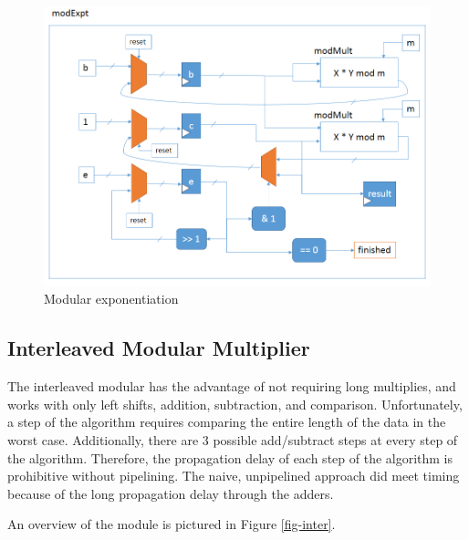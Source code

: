\documentclass[12pt]{article}
\begin{document}
\begin{figure}
  \begin{centering}
    \includegraphics[width=\textwidth]{modexpt.png}
    \caption{Modular exponentiation}
    \label{fig-expt}
  \end{centering}
\end{figure}

\subsection{Interleaved Modular Multiplier}
The interleaved modular has the advantage of not requiring long multiplies, and works with
only left shifts, addition, subtraction, and comparison. Unfortunately, a step of the 
algorithm requires comparing the entire length of the data in the worst case. Additionally,
there are 3 possible add/subtract steps at every step of the algorithm. Therefore, the propagation delay
of each step of the algorithm is prohibitive without pipelining. The naive, unpipelined approach did 
meet timing because of the long propagation delay through the adders.

An overview of the module is pictured in Figure \ref{fig-inter}.
\end{document}
